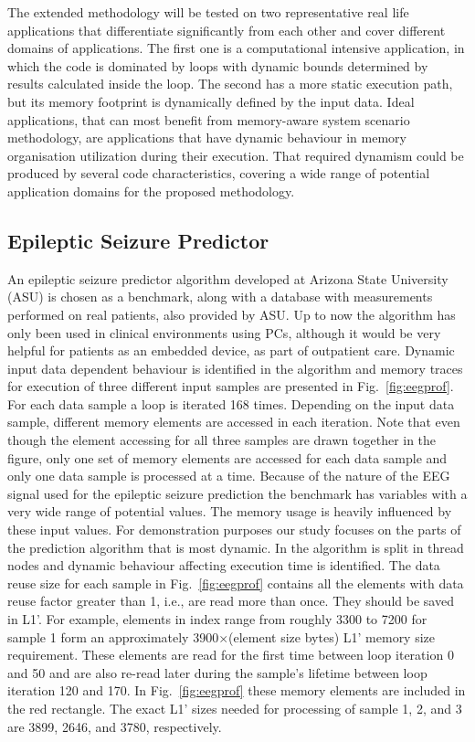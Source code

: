 The extended methodology will be tested on two representative real life applications that differentiate significantly from each other and cover different domains of applications. The first one is a computational intensive application, in which the code is dominated by loops with dynamic bounds determined by results calculated inside the loop. The second has a more static execution path, but its memory footprint is dynamically defined by the input data. Ideal applications, that can most benefit from memory-aware system scenario methodology, are applications that have dynamic behaviour in memory organisation utilization during their execution. That required dynamism could be produced by several code characteristics, covering a wide range of potential application domains for the proposed methodology.

\subsection{Epileptic Seizure Predictor}

An epileptic seizure predictor algorithm developed at Arizona State University (ASU) \cite{Iasemidis2005} is chosen as a benchmark, along with a database with measurements performed on real patients, also provided by ASU. Up to now the algorithm has only been used in clinical environments using PCs, although it would be very helpful for patients as an embedded device, as part of outpatient care. Dynamic input data dependent behaviour is identified in the algorithm and memory traces for execution of three different input samples are presented in Fig.~\ref{fig:eegprof}. For each data sample a loop is iterated 168 times. Depending on the input data sample, different memory elements are accessed in each iteration. Note that even though the element accessing for all three samples are drawn together in the figure, only one set of memory elements are accessed for each data sample and only one data sample is processed at a time. Because of the nature of the EEG signal used for the epileptic seizure prediction the benchmark has variables with a very wide range of potential values. The memory usage is heavily influenced by these input values. For demonstration purposes our study focuses on the parts of the prediction algorithm that is most dynamic. In \cite{Elena2010} the algorithm is split in thread nodes and dynamic behaviour affecting execution time is identified. The data reuse size for each sample in Fig.~\ref{fig:eegprof} contains all the elements with data reuse factor greater than 1, i.e., are read more than once. They should be saved in L1'. For example, elements in index range from roughly 3300 to 7200 for sample 1 form an approximately 3900$ \times $(element size bytes) L1' memory size requirement. These elements are read for the first time between loop iteration 0 and 50 and are also re-read later during the sample's lifetime between loop iteration 120 and 170. In Fig.~\ref{fig:eegprof} these memory elements are included in the red rectangle. The exact L1' sizes needed for processing of sample 1, 2, and 3 are 3899, 2646, and 3780, respectively.

